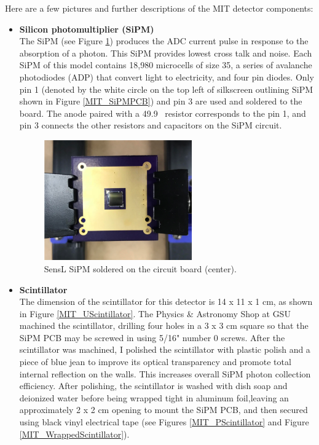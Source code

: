 Here are a few pictures and further descriptions of the MIT detector components:
\begin{itemize}
\item {\bf Silicon photomultiplier (SiPM)} \\
The SiPM (see Figure \ref{SiPM}) produces the ADC current pulse in response to the absorption of a photon.  This SiPM provides lowest cross talk and noise. Each SiPM of this model contains 18,980 microcells of size 35\textmu, a series of avalanche photodiodes (ADP) that convert light to electricity, and four pin diodes. Only pin 1 (denoted by the white circle on the top left of silkscreen outlining SiPM shown in Figure \ref{MIT_SiPMPCB}) and pin 3 are used and soldered to the board. The anode paired with a 49.9 \textOmega \ resistor corresponds to the pin 1, and pin 3 connects the other resistors and capacitors on the SiPM circuit. 
\begin{figure}[htb]
\centering
\includegraphics[width=0.60\textwidth]{images/SiPM.png} 
\caption{SensL SiPM soldered on the circuit board (center).}
\label{SiPM}
\end{figure}
\item {\bf Scintillator} \\
The dimension of the scintillator for this detector is 14 x 11 x 1 cm, as shown in Figure \ref{MIT_UScintillator}.  The Physics \& Astronomy Shop at GSU machined the scintillator, drilling four holes in a 3 x 3 cm square so that the SiPM PCB may be screwed in using 5/16" number 0 screws. After the scintillator was machined, I polished the scintillator with plastic polish and a piece of blue jean to improve its optical transparency and promote total internal reflection on the walls. This increases overall SiPM photon collection efficiency. After polishing, the scintillator is washed with dish soap and deionized water before being wrapped tight in aluminum foil,leaving an approximately 2 x 2 cm opening to mount the SiPM PCB, and then secured using black vinyl electrical tape (see Figures \ref{MIT_PScintillator} and Figure \ref{MIT_WrappedScintillator}). 

\end{itemize}
